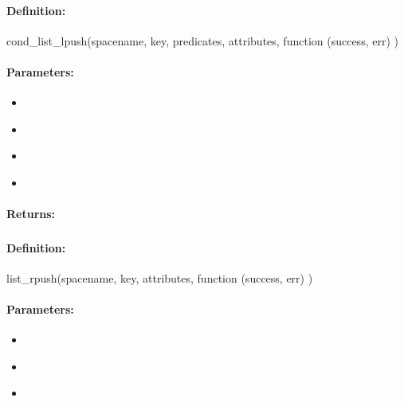 \paragraph{Definition:}
\begin{javascriptcode}
cond_list_lpush(spacename, key, predicates, attributes, function (success, err) {})
\end{javascriptcode}
\paragraph{Parameters:}
\begin{itemize}[noitemsep]
\item {}\\

\item {}\\

\item {}\\

\item {}\\

\end{itemize}

\paragraph{Returns:}


\pagebreak
\subsubsection{}
\label{api:nodejs:list_rpush}


\paragraph{Definition:}
\begin{javascriptcode}
list_rpush(spacename, key, attributes, function (success, err) {})
\end{javascriptcode}
\paragraph{Parameters:}
\begin{itemize}[noitemsep]
\item {}\\

\item {}\\

\item {}\\

\end{itemize}

